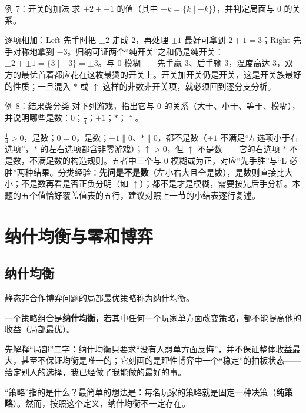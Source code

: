 \begin{problem}{例 7：开关的加法}
求 $\pm2+\pm1$ 的值（其中 $\pm k=\{k\mid -k\}$），并判定局面与 $0$ 的关系。
\end{problem}

\sol 逐项相加：Left 先手时把 $\pm2$ 走成 $2$，再处理 $\pm1$ 最好可拿到 $2+1=3$；Right 先手对称地拿到 $-3$。归纳可证两个“纯开关”之和仍是纯开关：$\pm2+\pm1=\{3\mid -3\}=\pm3$。与 $0$ 模糊——先手赢 $3$、后手输 $3$，温度高达 $3$，双方的最优首着都应花在这枚最烫的开关上。开关加开关仍是开关，这是开关族最好的性质；一旦混入 $\ast$ 或 $\uparrow$ 这样的非数非开关项，就必须回到逐分支分析。

\begin{problem}{例 8：结果类分类}
对下列游戏，指出它与 $0$ 的关系（大于、小于、等于、模糊），并说明哪些是数：$0$；$\tfrac14$；$\pm1$；$\ast$；$\uparrow$。
\end{problem}

\sol $\tfrac14>0$，是数；$0=0$，是数；$\pm1\parallel0$、$\ast\parallel0$，都不是数（$\pm1$ 不满足“左选项小于右选项”，$\ast$ 的左右选项都含非零游戏）；$\uparrow>0$，但 $\uparrow$ 不是数——它的右选项 $\ast$ 不是数，不满足数的构造规则。五者中三个与 $0$ 模糊或为正，对应“先手胜”与“L 必胜”两种结果。分类经验：\textbf{先问是不是数}（左小右大且全是数），是数则直接比大小；不是数再看是否正负分明（如 $\uparrow$）；都不是才是模糊，需要按先后手分析。本题的五个值恰好覆盖值表的五行，建议对照上一节的小结表逐行复述。



\chapter{纳什均衡与零和博弈}
\section{纳什均衡}
静态非合作博弈问题的局部最优策略称为纳什均衡。

\begin{definition}[纳什均衡]
一个策略组合是\textbf{纳什均衡}，若其中任何一个玩家单方面改变策略，都不能提高他的收益（局部最优）。
\end{definition}

先解释“局部”二字：纳什均衡只要求“没有人想单方面反悔”，并不保证整体收益最大，甚至不保证均衡是唯一的；它刻画的是理性博弈中一个“稳定”的拍板状态——给定别人的选择，我已经做了我能做的最好的事。

“策略”指的是什么？最简单的想法是：每名玩家的策略就是固定一种决策（\textbf{纯策略}）。然而，按照这个定义，纳什均衡不一定存在。

